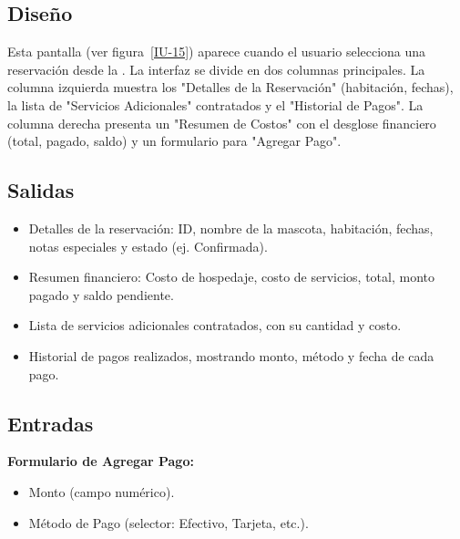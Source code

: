 \subsection{Diseño}
    Esta pantalla  (ver figura~\ref{IU-15}) aparece cuando el usuario selecciona una reservación desde la . La interfaz se divide en dos columnas principales. La columna izquierda muestra los "Detalles de la Reservación" (habitación, fechas), la lista de "Servicios Adicionales" contratados y el "Historial de Pagos". La columna derecha presenta un "Resumen de Costos" con el desglose financiero (total, pagado, saldo) y un formulario para "Agregar Pago".


\subsection{Salidas}
\begin{itemize}
    \item Detalles de la reservación: ID, nombre de la mascota, habitación, fechas, notas especiales y estado (ej. Confirmada).
    \item Resumen financiero: Costo de hospedaje, costo de servicios, total, monto pagado y saldo pendiente.
    \item Lista de servicios adicionales contratados, con su cantidad y costo.
    \item Historial de pagos realizados, mostrando monto, método y fecha de cada pago.
\end{itemize}

\subsection{Entradas}
    \textbf{Formulario de Agregar Pago:}
\begin{itemize}
    \item Monto (campo numérico).
    \item Método de Pago (selector: Efectivo, Tarjeta, etc.).
\end{itemize}

